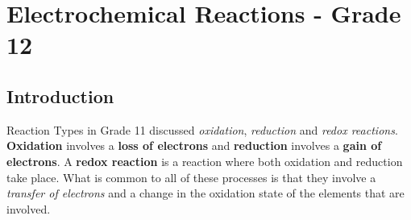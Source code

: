 






\chapter{Electrochemical Reactions - Grade 12}
\label{chap:electrochemical}



\section{Introduction}

Reaction Types in Grade 11 discussed \textit{oxidation}, \textit{reduction} and \textit{redox reactions}. \textbf{Oxidation} involves a \textbf{loss of electrons} and \textbf{reduction} involves a \textbf{gain of electrons}. A \textbf{redox reaction} is a reaction where both oxidation and reduction take place. What is common to all of these processes is that they involve a \textit{transfer of electrons} and a change in the oxidation state of the elements that are involved.

